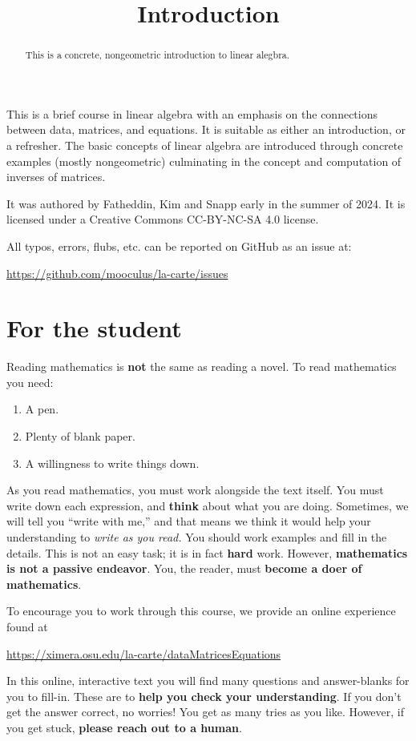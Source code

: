 \documentclass{ximera}
\title{Introduction}
\begin{document}
\begin{abstract}
  This is a concrete, nongeometric introduction to linear alegbra.
\end{abstract}
\maketitle

This is a brief course in linear algebra with an emphasis on the
connections between data, matrices, and equations. It is suitable as
either an introduction, or a refresher. The basic concepts of linear
algebra are introduced through concrete examples (mostly nongeometric)
culminating in the concept and computation of inverses of matrices.


It was authored by Fatheddin, Kim and Snapp early in the summer of
2024. It is licensed under a Creative Commons CC-BY-NC-SA 4.0 license. 



All typos, errors, flubs, etc. can be reported on GitHub as an issue at:
\begin{center}
\url{https://github.com/mooculus/la-carte/issues}
\end{center}


\section*{For the student}


Reading mathematics is \textbf{not} the same as reading a novel. To
read mathematics you need:
\begin{enumerate}
\item A pen.
\item Plenty of blank paper.
\item A willingness to write things down.
\end{enumerate}
As you read mathematics, you must work alongside the text itself. You
must write down each expression, and \textbf{think} about what you are
doing. Sometimes, we will tell you ``write with me,'' and that means
we think it would help your understanding to \textit{write as you
  read.}  You should work examples and fill in the details. This is
not an easy task; it is in fact \textbf{hard} work. However,
\textbf{mathematics is not a passive endeavor}. You, the reader, must \textbf{become a
  doer of mathematics}.


To encourage you to work through this course, we provide an online experience found at
\begin{center}
  \url{https://ximera.osu.edu/la-carte/dataMatricesEquations}
\end{center}

In this online, interactive text you will find many questions and
answer-blanks for you to fill-in. These are to \textbf{help you check
  your understanding}. If you don't get the answer correct, no
worries! You get as many tries as you like. However, if you get stuck,
\textbf{please reach out to a human}.
\end{document}
